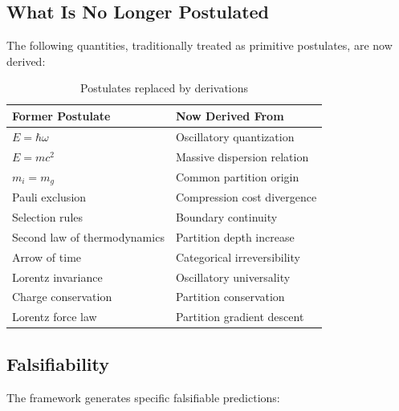 \documentclass[twocolumn,10pt,a4paper]{article}
\theoremstyle{definition}
\theoremstyle{remark}
\begin{document}
\subsection{What Is No Longer Postulated}

The following quantities, traditionally treated as primitive postulates, are now derived:

\begin{table}[H]
\centering
\caption{Postulates replaced by derivations}
\label{tab:postulates}
\small
\begin{tabular}{ll}
\toprule
\textbf{Former Postulate} & \textbf{Now Derived From} \\
\midrule
$E = \hbar\omega$ & Oscillatory quantization \\
$E = mc^2$ & Massive dispersion relation \\
$m_i = m_g$ & Common partition origin \\
Pauli exclusion & Compression cost divergence \\
Selection rules & Boundary continuity \\
Second law of thermodynamics & Partition depth increase \\
Arrow of time & Categorical irreversibility \\
Lorentz invariance & Oscillatory universality \\
Charge conservation & Partition conservation \\
Lorentz force law & Partition gradient descent \\
\bottomrule
\end{tabular}
\end{table}

\subsection{Falsifiability}

The framework generates specific falsifiable predictions:
\end{document}
